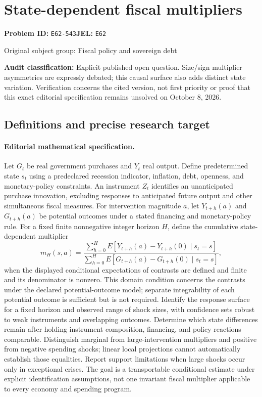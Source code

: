 \documentclass[11pt,a4paper]{article}
\begin{document}
\section*{State-dependent fiscal multipliers}
\textbf{Problem ID:} \texttt{E62-543}\quad \textbf{JEL:} \texttt{E62}\par
\label{problem:OP-0251}
{\sffamily\small\color{muted}Original subject group: Fiscal policy and sovereign debt\par}
\label{definitions:problem:30007532}
\textbf{Audit classification:} Explicit published open question. Size/sign multiplier asymmetries are expressly debated; this causal surface also adds distinct state variation. Verification concerns the cited version, not first priority or proof that this exact editorial specification remains unsolved on October 8, 2026.
\subsection*{Definitions and precise research target}
\paragraph{Editorial mathematical specification.} Let \(G_t\) be real government purchases and \(Y_t\) real output. Define predetermined state \(s_t\) using a predeclared recession indicator, inflation, debt, openness, and monetary-policy constraints. An instrument \(Z_t\) identifies an unanticipated purchase innovation, excluding responses to anticipated future output and other simultaneous fiscal measures. For intervention magnitude \(a\), let \(Y_{t+h}(a)\) and \(G_{t+h}(a)\) be potential outcomes under a stated financing and monetary-policy rule. For a fixed finite nonnegative integer horizon \(H\), define the cumulative state-dependent multiplier
\[
m_H(s,a)=
\frac{\sum_{h=0}^H E[Y_{t+h}(a)-Y_{t+h}(0)\mid s_t=s]}
{\sum_{h=0}^H E[G_{t+h}(a)-G_{t+h}(0)\mid s_t=s]},
\]
when the displayed conditional expectations of contrasts are defined and finite and its denominator is nonzero. This domain condition concerns the contrasts under the declared potential-outcome model; separate integrability of each potential outcome is sufficient but is not required. Identify the response surface for a fixed horizon and observed range of shock sizes, with confidence sets robust to weak instruments and overlapping outcomes. Determine which state differences remain after holding instrument composition, financing, and policy reactions comparable. Distinguish marginal from large-intervention multipliers and positive from negative spending shocks; linear local projections cannot automatically establish those equalities. Report support limitations when large shocks occur only in exceptional crises. The goal is a transportable conditional estimate under explicit identification assumptions, not one invariant fiscal multiplier applicable to every economy and spending program.
\end{document}
